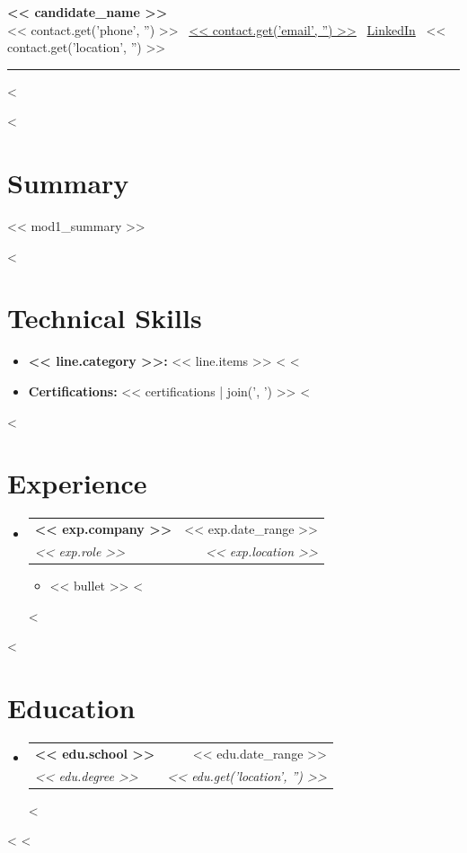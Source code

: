 \documentclass[letterpaper,10pt]{extarticle}
\makeatletter
\newcommand{\resumeSubHeadingListStart}{\begin{itemize}[leftmargin=0in, label={}]}
\newcommand{\resumeSubHeadingListEnd}{\end{itemize}}
\newcommand{\resumeItemListStart}{\begin{itemize}}
\newcommand{\resumeItemListEnd}{\end{itemize}\vspace{-2pt}}
\newcommand{\resumeItem}[1]{\item\small{#1}}
\newcommand{\resumeSubheading}[4]{%
  \vspace{-2pt}\item
  \begin{tabular*}{\textwidth}[t]{l@{\extracolsep{\fill}}r}
    \textbf{#1} & #2 \\
    \textit{\small#3} & \textit{\small #4} \\
  \end{tabular*}\vspace{-7pt}%
}
\makeatother
\begin{document}
\begin{center}
    {\Huge \textbf{<< candidate_name >>}} \\[4pt]
    \small
    << contact.get('phone', '') >>
    \textbar\ \href{mailto:<< contact.get('email', '') >>}{<< contact.get('email', '') >>}
    \textbar\ \href{<< contact.get('linkedin', '') >>}{LinkedIn}
    \textbar\ << contact.get('location', '') >>
\end{center}
\vspace{-4pt}
\noindent\rule{\textwidth}{0.5pt}

<%

  <%
  \section*{Summary}
  \vspace{-6pt}
  \small << mod1_summary >>
  \vspace{4pt}

  <%
  \section*{Technical Skills}
  \vspace{-6pt}
  \begin{itemize}[leftmargin=0.12in, label={}]
    \small
    <%
    \item{\textbf{<< line.category >>:} << line.items >>}
    <%
    <%
    \item{\textbf{Certifications:} << certifications | join(', ') >>}
    <%
  \end{itemize}
  \vspace{-8pt}

  <%
  \section*{Experience}
  \vspace{-6pt}
  \resumeSubHeadingListStart
  <%
    \resumeSubheading
      {<< exp.company >>}{<< exp.date_range >>}
      {<< exp.role >>}{<< exp.location >>}
      \resumeItemListStart
      <%
        \resumeItem{<< bullet >>}
      <%
      \resumeItemListEnd
  <%
  \resumeSubHeadingListEnd
  \vspace{-8pt}

  <%
  \section*{Education}
  \vspace{-6pt}
  \resumeSubHeadingListStart
  <%
    \resumeSubheading
      {<< edu.school >>}{<< edu.date_range >>}
      {<< edu.degree >>}{<< edu.get('location', '') >>}
  <%
  \resumeSubHeadingListEnd

  <%
<%
\end{document}
